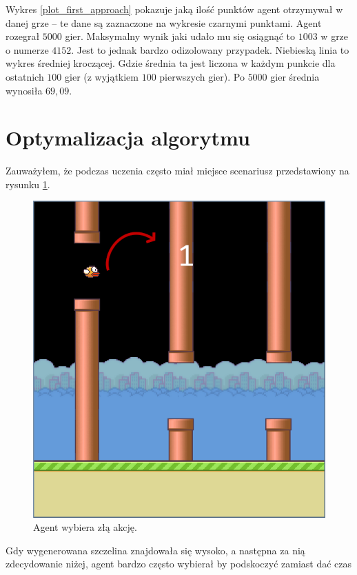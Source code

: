 \documentclass[a4paper, 12pt,oneside]{book}
\begin{document}
Wykres \ref{plot_first_approach} pokazuje jaką ilość punktów agent otrzymywał w
danej grze -- te dane są zaznaczone na wykresie czarnymi punktami. Agent
rozegrał $5000$ gier. Maksymalny wynik jaki udało mu się osiągnąć to $1003$ w
grze o numerze $4152$. Jest to jednak bardzo odizolowany przypadek. Niebieską
linia to wykres średniej kroczącej. Gdzie średnia ta jest liczona w każdym
punkcie dla ostatnich $100$ gier (z wyjątkiem $100$ pierwszych gier). Po $5000$
gier średnia wynosiła $69,09$.

\section{Optymalizacja algorytmu}
Zauważyłem, że podczas uczenia często miał miejsce scenariusz przedstawiony na
rysunku \ref{agent_top_pipe}.
\begin{figure}[!htb] 
	\begin{center}
		\includegraphics[scale=0.35]{agent_top_pipe_penalty.png}
	\end{center}
	\caption{Agent wybiera złą akcję.}
	\label{agent_top_pipe}
\end{figure}
Gdy wygenerowana szczelina znajdowała się wysoko, a następna za nią
zdecydowanie niżej, agent bardzo często wybierał by podskoczyć zamiast dać czas
\end{document}
